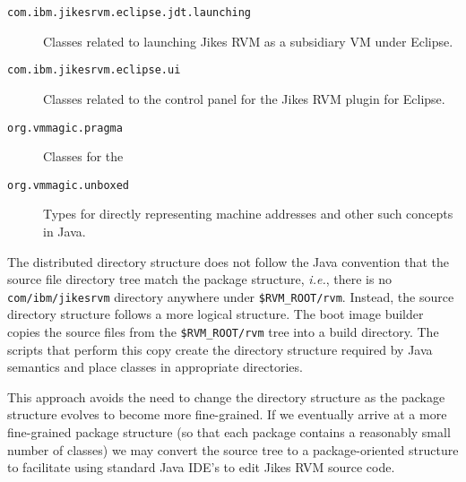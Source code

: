 \begin{description}
\item[\texttt{com.ibm.jikesrvm.eclipse.jdt.launching}] Classes related
to launching Jikes RVM as a subsidiary VM under Eclipse. 

\item[\texttt{com.ibm.jikesrvm.eclipse.ui}] Classes related
to the control panel for the Jikes RVM plugin for Eclipse.

\item[\texttt{org.vmmagic.pragma}] Classes for the 


\item[\texttt{org.vmmagic.unboxed}] Types for directly representing
machine addresses and other such concepts in Java.


\end{description}

The distributed directory structure
does not follow the Java\TMweb{} convention that the source file directory tree
match the package structure, {\it i.e.},
there is no {\tt com/ibm/jikesrvm} directory anywhere under \texttt{\$RVM\_ROOT/rvm}.  Instead, the source directory structure follows a more logical 
structure.  The boot image builder
copies the source files from the \texttt{\$RVM\_ROOT/rvm} tree into a build
directory.  The scripts that perform this copy create the directory
structure required by Java semantics and place classes in appropriate
directories.

This approach avoids the need to change the directory structure as the
package structure evolves to become more fine-grained. If we
eventually arrive at a more fine-grained package structure (so that
each package contains a reasonably small number of classes) we may
convert the source tree to a package-oriented structure to facilitate
using standard Java IDE's to edit Jikes RVM source code.
